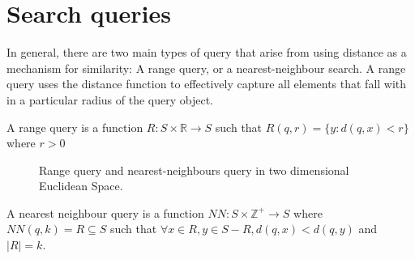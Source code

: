 \section{Search queries}
In general, there are two main types of query that arise from using distance as a mechanism for similarity: A range query, or a nearest-neighbour search.  A range query uses the distance function to effectively capture all elements that fall with in a particular radius of the query object.
  
\begin{mydef}
A range query is a function $R: S \times \mathbb{R} \rightarrow S$ such that $R(q, r) = \{y : d(q, x) < r\}$ where $r > 0$
\end{mydef}
%
%
\begin{figure}
\centering
{} \quad
{}
\caption[Range query and nearest-neighbours query in two dimensional Euclidean Space.]{Range query and nearest-neighbours query in two dimensional Euclidean Space.}
\end{figure}
%
\begin{mydef}
A nearest neighbour query is a function $NN:S \times \mathbb{Z}^+ \rightarrow S $ where $NN(q, k) = R \subseteq S$ such that $\forall x \in R, y \in S - R, d(q, x) < d(q,y) $ and $ |R| = k$.
\end{mydef}
%
